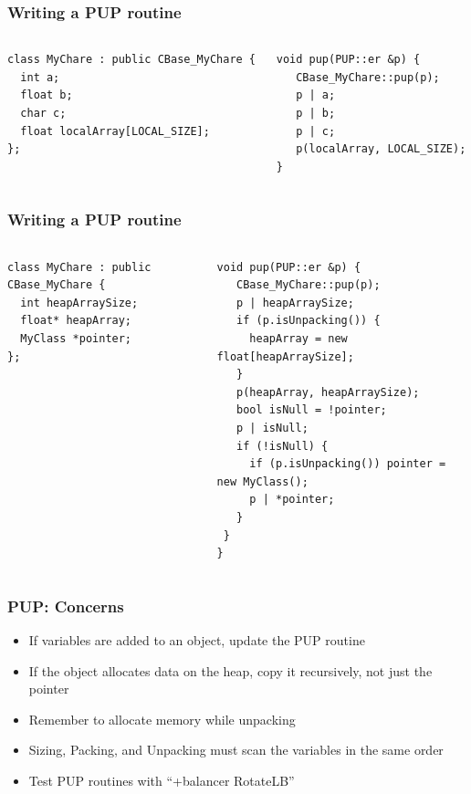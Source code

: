 \begin{frame}[fragile]
\frametitle{Writing a PUP routine}
 \begin{columns}
 \begin{column}{0.5\textwidth}
   \begin{lstlisting}
class MyChare : public CBase_MyChare {
  int a;
  float b;
  char c;
  float localArray[LOCAL_SIZE];
};
 \end{lstlisting}
 \end{column}
 \begin{column}{0.5\textwidth}
  \begin{lstlisting}
void pup(PUP::er &p) {
   CBase_MyChare::pup(p);
   p | a;
   p | b;
   p | c;
   p(localArray, LOCAL_SIZE);
}
  \end{lstlisting}
  \end{column}
  \end{columns}
\end{frame}

\begin{frame}[fragile]
\frametitle{Writing a PUP routine}
 \begin{columns}
 \begin{column}{0.5\textwidth}
   \begin{lstlisting}
class MyChare : public CBase_MyChare {
  int heapArraySize;
  float* heapArray;
  MyClass *pointer;
};
 \end{lstlisting}
 \end{column}
 \begin{column}{0.5\textwidth}
  \begin{lstlisting}
void pup(PUP::er &p) {
   CBase_MyChare::pup(p);
   p | heapArraySize;
   if (p.isUnpacking()) {
     heapArray = new float[heapArraySize];
   }
   p(heapArray, heapArraySize);
   bool isNull = !pointer;
   p | isNull;
   if (!isNull) {
     if (p.isUnpacking()) pointer = new MyClass();
     p | *pointer;
   }
 }
}
  \end{lstlisting}
  \end{column}
  \end{columns}
\end{frame}


\begin{frame}[fragile]
\frametitle{PUP: Concerns}
\begin{itemize}
\item If variables are added to an object, update the PUP routine
\item If the object allocates data on the heap, copy it recursively, not just the pointer
\item Remember to allocate memory while unpacking
\item Sizing, Packing, and Unpacking must scan the variables in the same order
\item Test PUP routines with “+balancer RotateLB”
\end{itemize}
\end{frame}





